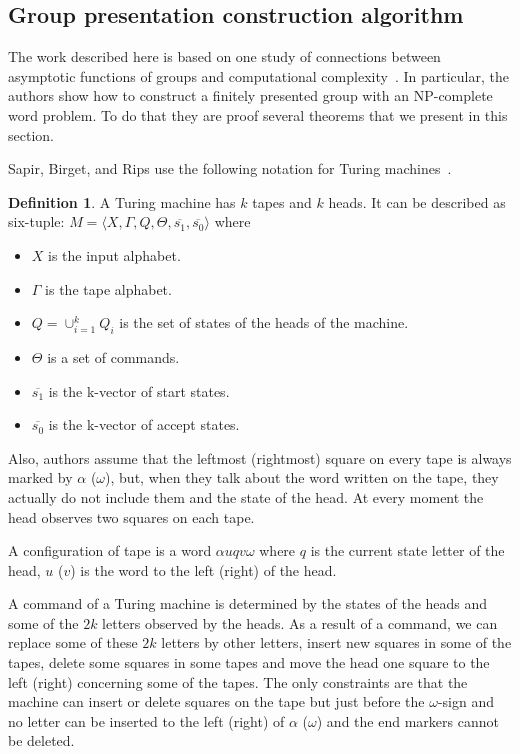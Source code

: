\documentclass[conference]{IEEEtran}
\theoremstyle{definition}
\newtheorem{defn}{Definition}[section]
\begin{document}
\subsection{Group presentation construction algorithm}

The work described here is based on one study of connections
between asymptotic functions of groups and computational complexity~\cite{Sapir}.
In particular, the authors show how to construct a finitely presented group
with an NP-complete word problem. To do that they are proof several theorems
that we present in this section.

Sapir, Birget, and Rips use the following notation for Turing machines~\cite{Sapir}.
\begin{defn}
A Turing machine has $k$ tapes and $k$ heads. It can be described as six-tuple:
$M = \langle X, \Gamma, Q, \Theta, \overline{s_1}, \overline{s_0} \rangle$
where
\begin{itemize}
    \item $X$ is the input alphabet.
    \item $\Gamma$ is the tape alphabet.
    \item $Q = \cup_{i=1}^k Q_i$ is the set of states of the heads of the machine.
    \item $\Theta$ is a set of commands.
    \item $\overline{s_1}$ is the k-vector of start states.
    \item $\overline{s_0}$ is the k-vector of accept states.
\end{itemize}
\end{defn}


Also, authors assume that the leftmost (rightmost) square on every tape is always marked by
$\alpha$ ($\omega$), but, when they talk about the word written on the tape,
they actually do not include them and the state of the head. At every moment the head
observes two squares on each tape.

A configuration of tape is a word $\alpha u q v \omega$ where $q$ is the current
state letter of the head, $u$ ($v$) is the word to the left (right) of the head.

A command of a Turing machine is determined by the states of the heads and some of the
$2k$ letters observed by the heads.
As a result of a command, we can replace some of these $2k$ letters by other letters,
insert new squares in some of the tapes, delete some squares in some tapes and move
the head one square to the left (right) concerning some of the tapes.
The only constraints are that the machine can insert or delete squares on the tape
but just before the $\omega$-sign and no letter can be inserted to the left (right)
of $\alpha$ ($\omega$) and the end markers cannot be deleted.
\end{document}
